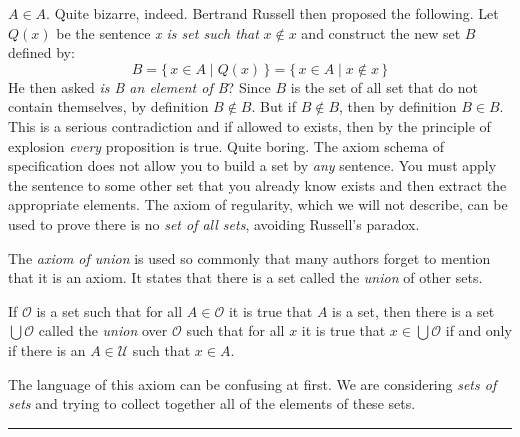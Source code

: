             $A\in{A}$. Quite bizarre, indeed. Bertrand Russell then proposed
            the following. Let $Q(x)$ be the sentence
            \textit{x is set such that} $x\notin{x}$ and construct the new
            set $B$ defined by:
            \begin{equation}
                B=\{\,x\in{A}\;|\;Q(x)\,\}=\{\,x\in{A}\;|\;x\notin{x}\,\}
            \end{equation}
            He then asked \textit{is B an element of B}? Since $B$ is the
            set of all set that do not contain themselves, by definition
            $B\notin{B}$. But if $B\notin{B}$, then by definition $B\in{B}$.
            This is a serious contradiction and if allowed to exists, then by
            the principle of explosion \textit{every} proposition is true.
            Quite boring. The axiom schema of specification does not allow you
            to build a set by \textit{any} sentence. You must apply the
            sentence to some other set that you already know exists and then
            extract the appropriate elements. The axiom of regularity, which
            we will not describe, can be used to prove there is no
            \textit{set of all sets}, avoiding Russell's paradox.
            \par\hfill\par
            The \textit{axiom of union} is used so commonly that many authors
            forget to mention that it is an axiom. It states that there is a
            set called the \textit{union} of other sets.
            \begin{axiom}
                If $\mathcal{O}$ is a set such that for all $A\in\mathcal{O}$ it
                is true that $A$ is a set, then there is a set
                $\bigcup\mathcal{O}$ called the \textit{union} over
                $\mathcal{O}$ such that for all $x$ it is true that
                $x\in\bigcup\mathcal{O}$ if and only if there is an
                $A\in\mathcal{U}$ such that $x\in{A}$.
            \end{axiom}
            The language of this axiom can be confusing at first. We are
            considering \textit{sets of sets} and trying to collect together
            all of the elements of these sets.
            \par\hfill\par\hrule
